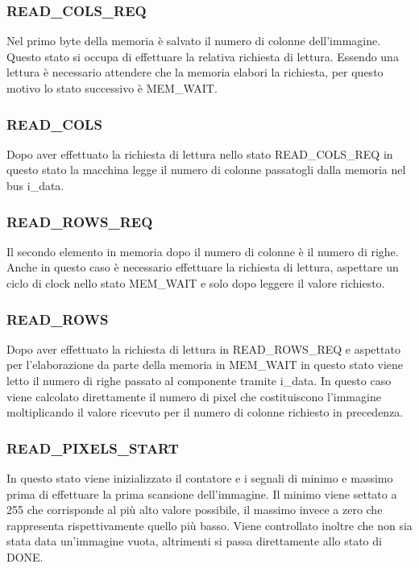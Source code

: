 \documentclass{article}
\begin{document}
\subsubsection{READ\_COLS\_REQ}
Nel primo byte della memoria è salvato il numero di colonne dell'immagine. Questo stato si occupa di effettuare la relativa richiesta di lettura. Essendo una lettura è necessario attendere che la memoria elabori la richiesta, per questo motivo lo stato successivo è MEM\_WAIT.

\subsubsection{READ\_COLS}
Dopo aver effettuato la richiesta di lettura nello stato READ\_COLS\_REQ in questo stato la macchina legge il numero di colonne passatogli dalla memoria nel bus i\_data.

\subsubsection{READ\_ROWS\_REQ}
Il secondo elemento in memoria dopo il numero di colonne è il numero di righe. Anche in questo caso è necessario effettuare la richiesta di lettura, aspettare un ciclo di clock nello stato MEM\_WAIT e solo dopo leggere il valore richiesto.

\subsubsection{READ\_ROWS}
Dopo aver effettuato la richiesta di lettura in READ\_ROWS\_REQ e aspettato per l'elaborazione da parte della memoria in MEM\_WAIT in questo stato viene letto il numero di righe passato al componente tramite i\_data. In questo caso viene calcolato direttamente il numero di pixel che costituiscono l'immagine moltiplicando il valore ricevuto per il numero di colonne richiesto in precedenza.

\subsubsection{READ\_PIXELS\_START}
In questo stato viene inizializzato il contatore  e i segnali di minimo e massimo prima di effettuare la prima scansione dell'immagine. Il minimo viene settato a 255 che corrisponde al più alto valore possibile, il massimo invece a zero che rappresenta rispettivamente quello più basso. Viene controllato inoltre che non sia stata data un'immagine vuota, altrimenti si passa direttamente allo stato di DONE.
\end{document}
